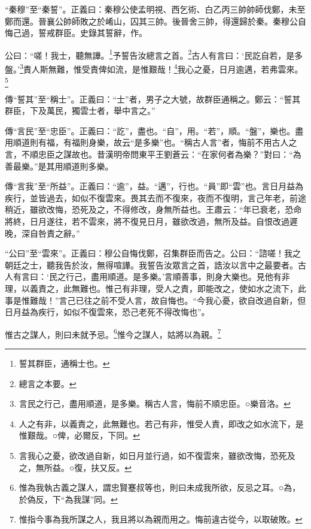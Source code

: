 {\noindent\shu{}\fzkt “秦穆”至“秦誓”。正義曰：秦穆公使孟明視、西乞術、白乙丙三帥帥師伐鄭，未至鄭而還。晉襄公帥師敗之於崤山，囚其三帥。後晉舍三帥，得還歸於秦。秦穆公自悔己過，誓戒群臣。史錄其誓辭，作。 \par}

公曰：“嗟！我士，聽無譁。\footnote{誓其群臣，通稱士也。}予誓告汝總言之首。\footnote{總言之本要。}古人有言曰：‘民訖自若，是多盤。’\footnote{言民之行己，盡用順道，是多樂。稱古人言，悔前不順忠臣。○樂音洛。}責人斯無難，惟受責俾如流，是惟艱哉！\footnote{人之有非，以義責之，此無難也。若己有非，惟受人責，即改之如水流下，是惟艱哉。○俾，必爾反，下同。}我心之憂，日月逾邁，若弗雲來。\footnote{言我心之憂，欲改過自新，如日月並行過，如不復雲來，雖欲改悔，恐死及之，無所益。○復，扶又反。}


{\noindent\zhuan{}\fzbyks 傳“誓其”至“稱士”。正義曰：“士”者，男子之大號，故群臣通稱之。鄭云：“誓其群臣，下及萬民，獨雲士者，舉中言之。” \par}

{\noindent\zhuan{}\fzbyks 傳“言民”至“忠臣”。正義曰：“訖”，盡也。“自”，用。“若”，順。“盤”，樂也。盡用順道則有福，有福則身樂，故云“是多樂”也。“稱古人言”者，悔前不用古人之言，不順忠臣之謀故也。昔漢明帝問東平王劉蒼云：“在家何者為樂？”對曰：“為善最樂。”是其用順道則多樂。 \par}

{\noindent\zhuan{}\fzbyks 傳“言我”至“所益”。正義曰：“逾”，益。“邁”，行也。“員”即“雲”也。言日月益為疾行，並皆過去，如似不復雲來。畏其去而不復來，夜而不復明，言己年老，前途稍近，雖欲改悔，恐死及之，不得修改，身無所益也。王肅云：“年已衰老，恐命將終，日月遂往，若不雲來，將不復見日月，雖欲改過，無所及益。自恨改過遲晚，深自咎責之辭。” \par}

{\noindent\shu{}\fzkt “公曰”至“雲來”。正義曰：穆公自悔伐鄭，召集群臣而告之。公曰：“諮嗟！我之朝廷之士，聽我告於汝，無得喧譁。我誓告汝眾言之首，誥汝以言中之最要者。古人有言曰：‘民之行己，盡用順道。是多樂。’言順善事，則身大樂也。見他有非理，以義責之，此無難也。惟己有非理，受人之責，即能改之，使如水之流下，此事是惟難哉！”言己已往之前不受人言，故自悔也。“今我心憂，欲自改過自新，但日月益為疾行，如似不復雲來，恐己老死不得改悔也”。 \par}

惟古之謀人，則曰未就予忌。\footnote{惟為我執古義之謀人，謂忠賢蹇叔等也，則曰未成我所欲，反忌之耳。○為，於偽反，下“為我謀”同。}惟今之謀人，姑將以為親。\footnote{惟指今事為我所謀之人，我且將以為親而用之。悔前違古從今，以取破敗。}

